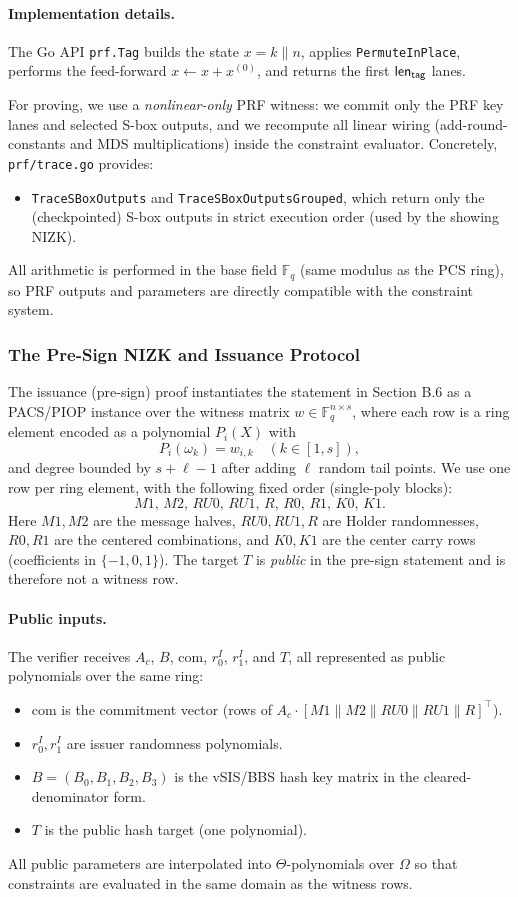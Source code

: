 \paragraph{Implementation details.}
The Go API \texttt{prf.Tag} builds the state $x=k\|n$, applies \texttt{PermuteInPlace}, performs the feed-forward
$x\leftarrow x+ x^{(0)}$, and returns the first $\mathsf{len}_{\mathsf{tag}}$ lanes.

For proving, we use a \emph{nonlinear-only} PRF witness: we commit only the PRF key lanes and selected S-box outputs,
and we recompute all linear wiring (add-round-constants and MDS multiplications) inside the constraint evaluator.
Concretely, \texttt{prf/trace.go} provides:
\begin{itemize}
  \item \texttt{TraceSBoxOutputs} and \texttt{TraceSBoxOutputsGrouped}, which return only the (checkpointed) S-box outputs in
  strict execution order (used by the showing NIZK).
\end{itemize}
All arithmetic is performed in the base field $\mathbb{F}_q$ (same modulus as the PCS ring), so PRF outputs and
parameters are directly compatible with the constraint system.

\subsubsection{The Pre-Sign NIZK and Issuance Protocol}
The issuance (pre-sign) proof instantiates the statement in Section B.6 as a PACS/PIOP instance over the witness matrix
$w\in\mathbb{F}_q^{n\times s}$, where each row is a ring element encoded as a polynomial $P_i(X)$ with
\[
P_i(\omega_k)=w_{i,k}\quad(k\in[1,s]),
\]
and degree bounded by $s+\ell-1$ after adding $\ell$ random tail points. We use one row per ring element, with the
following fixed order (single-poly blocks):
\[
M1,\,M2,\,RU0,\,RU1,\,R,\,R0,\,R1,\,K0,\,K1.
\]
Here $M1,M2$ are the message halves, $RU0,RU1,R$ are Holder randomnesses, $R0,R1$ are the centered combinations, and
$K0,K1$ are the center carry rows (coefficients in $\{-1,0,1\}$). The target $T$ is \emph{public} in the pre-sign
statement and is therefore not a witness row.

\paragraph{Public inputs.}
The verifier receives $A_c$, $B$, $\mathrm{com}$, $r^I_0$, $r^I_1$, and $T$, all represented as public polynomials over
the same ring:
\begin{itemize}
  \item $\mathrm{com}$ is the commitment vector (rows of $A_c\cdot[M1\|M2\|RU0\|RU1\|R]^\top$).
  \item $r^I_0,r^I_1$ are issuer randomness polynomials.
  \item $B=(B_0,B_1,B_2,B_3)$ is the vSIS/BBS hash key matrix in the cleared-denominator form.
  \item $T$ is the public hash target (one polynomial).
\end{itemize}
All public parameters are interpolated into $\Theta$-polynomials over $\Omega$ so that constraints are evaluated in the
same domain as the witness rows.

